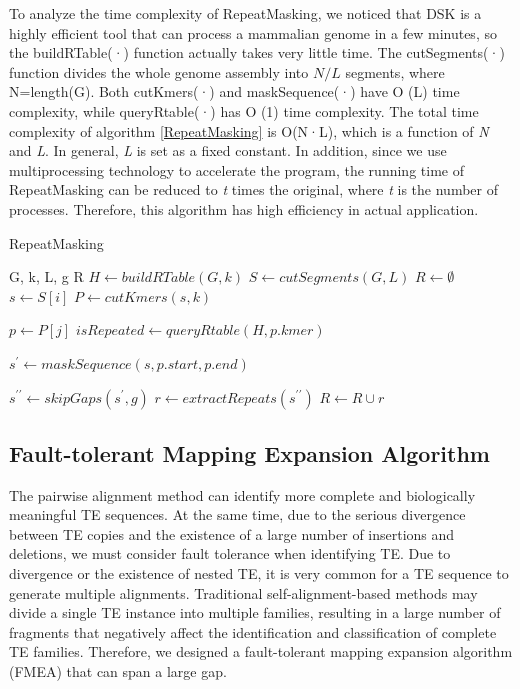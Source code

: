 \documentclass{bmcart}
\begin{document}
To analyze the time complexity of RepeatMasking, we noticed that DSK is a highly efficient tool that can process a mammalian genome in a few minutes, so the buildRTable(·) function actually takes very little time. The cutSegments(·) function divides the whole genome assembly into $N/L$ segments, where N=length(G). Both cutKmers(·) and maskSequence(·) have O (L) time complexity, while queryRtable(·) has O (1) time complexity. The total time complexity of algorithm \ref{RepeatMasking} is O(N·L), which is a function of \emph{N} and \emph{L}. In general, \emph{L} is set as a fixed constant. In addition, since we use multiprocessing technology to accelerate the program, the running time of RepeatMasking can be reduced to \emph{t} times the original, where \emph{t} is the number of processes. Therefore, this algorithm has high efficiency in actual application.
\begin{algorithm}  
	\caption{RepeatMasking}\label{RepeatMasking}
	\begin{algorithmic}[1]  
		\Require 
		G, k, L, g
		\Ensure 
		R
		\State $H \gets buildRTable(G, k)$
		\State $S \gets cutSegments(G, L)$
		\State $R \gets \emptyset$
		\State $s \gets S[i]$
		\State $P \gets cutKmers(s, k)$
		
		\State $p \gets P[j]$
		\State $isRepeated \gets queryRtable(H, p.kmer)$
		
		\State $s^{\prime} \gets maskSequence(s, p.start, p.end)$          
		\EndIf
		
		\EndFor 
		
		\State $s^{\prime \prime} \gets skipGaps(s^{\prime}, g)$ 
		\State $r \gets extractRepeats(s^{\prime \prime})$ 
		\State $R \gets R \cup r$ 
		
		\EndFor             
		\EndFunction
	\end{algorithmic}  
\end{algorithm}

\subsection*{Fault-tolerant Mapping Expansion Algorithm}
The pairwise alignment method can identify more complete and biologically meaningful TE sequences. At the same time, due to the serious divergence between TE copies and the existence of a large number of insertions and deletions, we must consider fault tolerance when identifying TE. Due to divergence or the existence of nested TE, it is very common for a TE sequence to generate multiple alignments. Traditional self-alignment-based methods may divide a single TE instance into multiple families, resulting in a large number of fragments that negatively affect the identification and classification of complete TE families. Therefore, we designed a fault-tolerant mapping expansion algorithm (FMEA) that can span a large gap.
\end{document}
